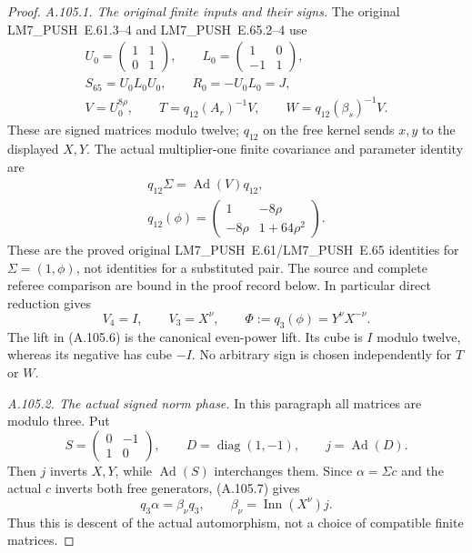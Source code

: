 \begin{proof}
\emph{A.105.1. The original finite inputs and their signs.}
The original LM7\_PUSH~E.61.3--4 and LM7\_PUSH~E.65.2--4 use
\[
\begin{gathered}
 U_0=\begin{pmatrix}1&1\\0&1\end{pmatrix},\qquad
 L_0=\begin{pmatrix}1&0\\-1&1\end{pmatrix},\\
 S_{65}=U_0L_0U_0,\qquad R_0=-U_0L_0=J,\\
 V=U_0^{8\rho},\qquad
 T=q_{12}(A_r)^{-1}V,\qquad
 W=q_{12}(\beta_s)^{-1}V.
\end{gathered}
\tag{A.105.6}
\]
These are signed matrices modulo twelve; \(q_{12}\) on the free
kernel sends \(x,y\) to the displayed \(X,Y\). The actual
multiplier-one finite covariance and parameter identity are
\[
\begin{gathered}
 q_{12}\Sigma=\operatorname{Ad}(V)q_{12},\\
 q_{12}(\phi)=
 \begin{pmatrix}1&-8\rho\\-8\rho&1+64\rho^2\end{pmatrix}.
\end{gathered}
\tag{A.105.7}
\]
These are the proved original LM7\_PUSH~E.61/LM7\_PUSH~E.65 identities for
\(\Sigma=(1,\phi)\), not identities for a substituted pair.
The source and complete referee comparison are bound in the
proof record below. In particular direct reduction gives
\[
 V_4=I,\qquad V_3=X^\nu,\qquad
 \Phi:=q_3(\phi)=Y^\nu X^{-\nu}.
\tag{A.105.8}
\]
The lift in (A.105.6) is the canonical even-power lift. Its cube
is \(I\) modulo twelve, whereas its negative has cube \(-I\).
No arbitrary sign is chosen independently for \(T\) or \(W\).

\emph{A.105.2. The actual signed norm phase.}
In this paragraph all matrices are modulo three. Put
\[
 S=\begin{pmatrix}0&-1\\1&0\end{pmatrix},\qquad
 D=\operatorname{diag}(1,-1),\qquad j=\operatorname{Ad}(D).
\]
Then \(j\) inverts \(X,Y\), while \(\operatorname{Ad}(S)\)
interchanges them. Since \(\alpha=\Sigma c\) and the actual
\(c\) inverts both free generators, (A.105.7) gives
\[
 q_3\alpha=\beta_\nu q_3,\qquad
 \beta_\nu=\operatorname{Inn}(X^\nu)j.
\tag{A.105.9}
\]
Thus this is descent of the actual automorphism, not a choice
of compatible finite matrices.


\end{proof}
